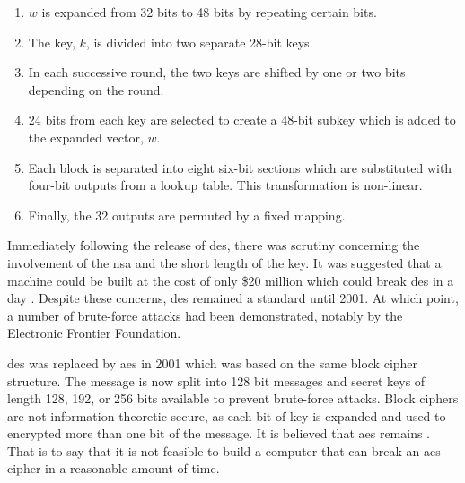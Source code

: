 \begin{algorithm}
\label{alg:des}
\begin{enumerate}
	\item $w$ is expanded from 32 bits to 48 bits by repeating certain bits.
	\item The key, $k$, is divided into two separate 28-bit keys. 
	\item In each successive round, the two keys are shifted by one or two bits depending on the round.
	\item 24 bits from each key are selected to create a 48-bit subkey which is added to the expanded vector, $w$. 
	\item Each block is separated into eight six-bit sections which are substituted with four-bit outputs from a lookup table. This transformation is non-linear.
	\item Finally, the 32 outputs are permuted by a fixed mapping.
\end{enumerate}
\end{algorithm}

Immediately following the release of \ac{des}, there was scrutiny concerning the involvement of the \ac{nsa} and the short length of the key. It was suggested that a machine could be built at the cost of only \$20 million which could break \ac{des} in a day \cite{Diffie1977}. Despite these concerns, \ac{des} remained a standard until 2001. At which point, a number of brute-force attacks had been demonstrated, notably by the Electronic Frontier Foundation. 

\Ac{des} was replaced by \ac{aes} in 2001 \cite{aes2001} which was based on the same block cipher structure. The message is now split into 128 bit messages and secret keys of length 128, 192, or 256 bits available to prevent brute-force attacks. Block ciphers are not information-theoretic secure, as each bit of key is expanded and used to encrypted more than one bit of the message. It is believed that \ac{aes} remains . That is to say that it is not feasible to build a computer that can break an \ac{aes} cipher in a reasonable amount of time. 



